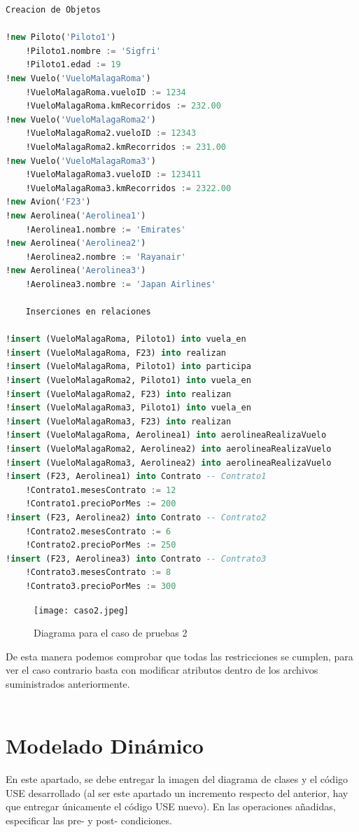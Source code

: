 \documentclass[12pt.a4paper]{article}
\begin{document}
\begin{lstlisting}[style = useNormal,language=SQL, caption={Codigo de pruebas 2}] 
    Creacion de Objetos
    
!new Piloto('Piloto1')
    !Piloto1.nombre := 'Sigfri'
    !Piloto1.edad := 19
!new Vuelo('VueloMalagaRoma')
    !VueloMalagaRoma.vueloID := 1234
    !VueloMalagaRoma.kmRecorridos := 232.00
!new Vuelo('VueloMalagaRoma2')
    !VueloMalagaRoma2.vueloID := 12343
    !VueloMalagaRoma2.kmRecorridos := 231.00
!new Vuelo('VueloMalagaRoma3')
    !VueloMalagaRoma3.vueloID := 123411
    !VueloMalagaRoma3.kmRecorridos := 2322.00
!new Avion('F23')
!new Aerolinea('Aerolinea1')
    !Aerolinea1.nombre := 'Emirates'
!new Aerolinea('Aerolinea2')
    !Aerolinea2.nombre := 'Rayanair'
!new Aerolinea('Aerolinea3')
    !Aerolinea3.nombre := 'Japan Airlines'

    Inserciones en relaciones
    
!insert (VueloMalagaRoma, Piloto1) into vuela_en
!insert (VueloMalagaRoma, F23) into realizan
!insert (VueloMalagaRoma, Piloto1) into participa
!insert (VueloMalagaRoma2, Piloto1) into vuela_en
!insert (VueloMalagaRoma2, F23) into realizan
!insert (VueloMalagaRoma3, Piloto1) into vuela_en
!insert (VueloMalagaRoma3, F23) into realizan
!insert (VueloMalagaRoma, Aerolinea1) into aerolineaRealizaVuelo
!insert (VueloMalagaRoma2, Aerolinea2) into aerolineaRealizaVuelo
!insert (VueloMalagaRoma3, Aerolinea2) into aerolineaRealizaVuelo
!insert (F23, Aerolinea1) into Contrato -- Contrato1
    !Contrato1.mesesContrato := 12
    !Contrato1.precioPorMes := 200
!insert (F23, Aerolinea2) into Contrato -- Contrato2
    !Contrato2.mesesContrato := 6
    !Contrato2.precioPorMes := 250
!insert (F23, Aerolinea3) into Contrato -- Contrato3
    !Contrato3.mesesContrato := 8
    !Contrato3.precioPorMes := 300
\end{lstlisting}
\begin{figure}[H]
     \texttt{[image: caso2.jpeg]}
     \caption{Diagrama para el caso de pruebas 2}
     \label{Diagrama del sistema de aviacion}
\end{figure}

De esta manera podemos comprobar que todas las restricciones se cumplen, para ver el caso contrario basta con modificar atributos dentro de los archivos suministrados anteriormente.\\\\

\newpage
\section{Modelado Dinámico}
En este apartado, se debe entregar la imagen del diagrama de clases y el código USE desarrollado (al ser este apartado un incremento respecto del anterior, hay que entregar únicamente el código USE nuevo). En las operaciones añadidas, especificar las pre- y post- condiciones.
\end{document}
